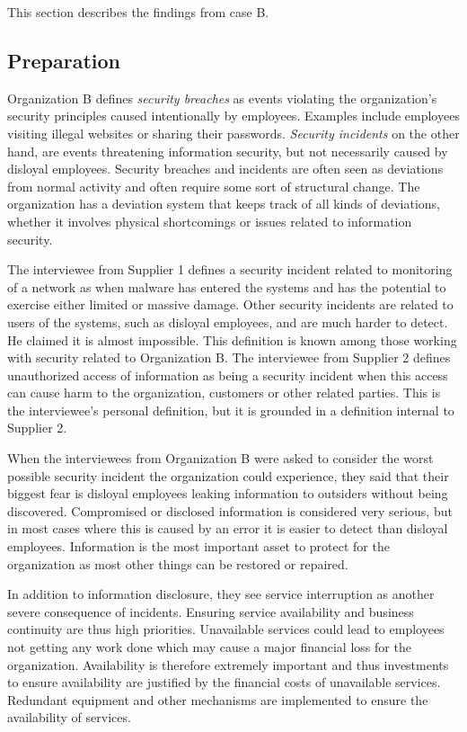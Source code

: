 This section describes the findings from case B.

\subsection{Preparation}
Organization B defines \textit{security breaches} as events violating the organization's security principles caused intentionally by employees. Examples include employees visiting illegal websites or sharing their passwords. \textit{Security incidents} on the other hand, are events threatening information security, but not necessarily caused by disloyal employees. Security breaches and incidents are often seen as deviations from normal activity and often require some sort of structural change. The organization has a deviation system that keeps track of all kinds of deviations, whether it involves physical shortcomings or issues related to information security.

The interviewee from Supplier 1 defines a security incident related to monitoring of a network as when malware has entered the systems and has the potential to exercise either limited or massive damage. Other security incidents are related to users of the systems, such as disloyal employees, and are much harder to detect. He claimed it is almost impossible. This definition is known among those working with security related to Organization B. The interviewee from Supplier 2 defines unauthorized access of information as being a security incident when this access can cause harm to the organization, customers or other related parties. This is the interviewee's personal definition, but it is grounded in a definition internal to Supplier 2.

When the interviewees from Organization B were asked to consider the worst possible security incident the organization could experience, they said that their biggest fear is disloyal employees leaking information to outsiders without being discovered. Compromised or disclosed information is considered very serious, but in most cases where this is caused by an error it is easier to detect than disloyal employees. Information is the most important asset to protect for the organization as most other things can be restored or repaired.

In addition to information disclosure, they see service interruption as another severe consequence of incidents. Ensuring service availability and business continuity are thus high priorities. Unavailable services could lead to employees not getting any work done which may cause a major financial loss for the organization. Availability is therefore extremely important and thus investments to ensure availability are justified by the financial costs of unavailable services. Redundant equipment and other mechanisms are implemented to ensure the availability of services. 

